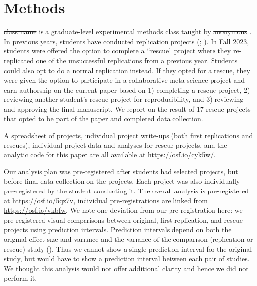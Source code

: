 \documentclass[
  english,
  a4paper,
]{article}
\providecommand{\DIFaddtex}[1]{{\protect\color{blue}\uwave{#1}}} %
\providecommand{\DIFdeltex}[1]{{\protect\color{red}\sout{#1}}}                      %
\providecommand{\DIFaddbegin}{} %
\providecommand{\DIFaddend}{} %
\providecommand{\DIFdelbegin}{} %
\providecommand{\DIFdelend}{} %
\providecommand{\DIFadd}[1]{\texorpdfstring{\DIFaddtex{#1}}{#1}} %
\providecommand{\DIFdel}[1]{\texorpdfstring{\DIFdeltex{#1}}{}} %
\newcommand{\DIFscaledelfig}{0.5}
\newlength{\DIFdelgraphicswidth} %
\newlength{\DIFdelgraphicsheight} %
\newcommand{\DIFaddincludegraphics}[2][]{{\color{blue}\fbox{\DIFOincludegraphics[#1]{#2}}}} %
\newcommand{\DIFdelincludegraphics}[2][]{%
\sbox{\DIFdelgraphicsbox}{\DIFOincludegraphics[#1]{#2}}%
\settoboxwidth{\DIFdelgraphicswidth}{\DIFdelgraphicsbox} %
\settoboxtotalheight{\DIFdelgraphicsheight}{\DIFdelgraphicsbox} %
\scalebox{\DIFscaledelfig}{%
\parbox[b]{\DIFdelgraphicswidth}{\usebox{\DIFdelgraphicsbox}\\[-\baselineskip] \rule{\DIFdelgraphicswidth}{0em}}\llap{\resizebox{\DIFdelgraphicswidth}{\DIFdelgraphicsheight}{%
\setlength{\unitlength}{\DIFdelgraphicswidth}%
\begin{picture}(1,1)%
\thicklines\linethickness{2pt} %
{\color[rgb]{1,0,0}\put(0,0){\framebox(1,1){}}}%
{\color[rgb]{1,0,0}\put(0,0){\line( 1,1){1}}}%
{\color[rgb]{1,0,0}\put(0,1){\line(1,-1){1}}}%
\end{picture}%
}\hspace*{3pt}}} %
} %
\DeclareRobustCommand{\DIFaddbegin}{\DIFOaddbegin \let\includegraphics\DIFaddincludegraphics} %
\DeclareRobustCommand{\DIFaddend}{\DIFOaddend \let\includegraphics\DIFOincludegraphics} %
\DeclareRobustCommand{\DIFdelbegin}{\DIFOdelbegin \let\includegraphics\DIFdelincludegraphics} %
\DeclareRobustCommand{\DIFdelend}{\DIFOaddend \let\includegraphics\DIFOincludegraphics} %
\begin{document}
\section{Methods}\label{methods}

\DIFdelbegin %
\DIFdel{class name}%
\DIFdelend \DIFaddbegin \DIFadd{PSYCH 251 }\DIFaddend is a graduate-level experimental methods class taught by \DIFdelbegin %
\DIFdel{anonymous}%
\DIFdelend \DIFaddbegin \DIFadd{MCF}\DIFaddend .
In previous years, students have conducted replication projects (; ).
In Fall 2023, students were offered the option to complete a ``rescue'' project where they re-replicated one of the unsuccessful replications from a previous year.
Students could also opt to do a normal replication instead.
If they opted for a rescue, they were given the option to participate in a collaborative meta-science project and earn authorship on the current paper based on 1) completing a rescue project, 2) reviewing another student's rescue project for reproducibility, and 3) reviewing and approving the final manuscript.
We report on the result of 17 rescue projects that opted to be part of the paper and completed data collection.

A spreadsheet of projects, individual project write-ups (both first replications and rescues), individual project data and analyses for rescue projects, and the analytic code for this paper are all available at \DIFdelbegin %
\DIFdelend \DIFaddbegin \url{https://osf.io/cyk5w/}\DIFaddend .

Our analysis plan was pre-registered after students had selected projects, but before final data collection on the projects.
Each project was also individually pre-registered by the student conducting it.
The overall analysis is pre-registered at \url{https://osf.io/5qz7v}, individual pre-registrations are linked from \url{https://osf.io/vkbfw}.
We note one deviation from our pre-registration here: we pre-registered visual comparisons between original, first replication, and rescue projects using prediction intervals.
Prediction intervals depend on both the original effect size and variance and the variance of the comparison (replication or rescue) study ().
Thus we cannot show a single prediction interval for the original study, but would have to show a prediction interval between each pair of studies.
We thought this analysis would not offer additional clarity and hence we did not perform it.
\end{document}
